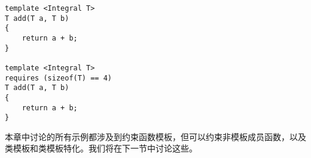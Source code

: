 \begin{lstlisting}[style=styleCXX]
template <Integral T>
T add(T a, T b)
{
	return a + b;
}

template <Integral T>
requires (sizeof(T) == 4)
T add(T a, T b)
{
	return a + b;
}
\end{lstlisting}

本章中讨论的所有示例都涉及到约束函数模板，但可以约束非模板成员函数，以及类模板和类模板特化。我们将在下一节中讨论这些。





























